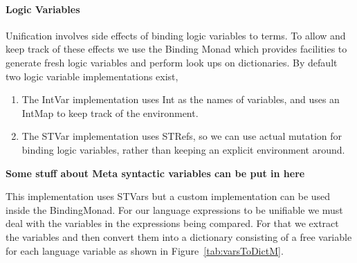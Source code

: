 \documentclass[thesis-solanki.tex]{subfiles}
\begin{document}
\paragraph{Logic Variables}
Unification involves side effects of binding logic variables to terms. To allow and keep track of these effects we use the Binding Monad
which provides facilities to generate fresh logic variables and perform look ups on dictionaries. By default two logic variable
implementations exist,

\begin{enumerate}
\item The IntVar implementation uses Int as the names of variables, and uses an
IntMap to keep track of the environment.

\item The STVar implementation uses STRefs, so we can use actual mutation for binding logic variables,
rather than keeping an explicit environment around.

\end{enumerate}

\textbf{Some stuff about Meta syntactic variables can be put in here}

This implementation uses STVars but a custom implementation can be used inside the BindingMonad.
For our language expressions to be unifiable we must deal with the variables in the expressions being compared. For that we extract the
variables and then convert them into a dictionary consisting of a free
variable for each language variable as shown in Figure~\ref{tab:varsToDictM}.
\end{document}
